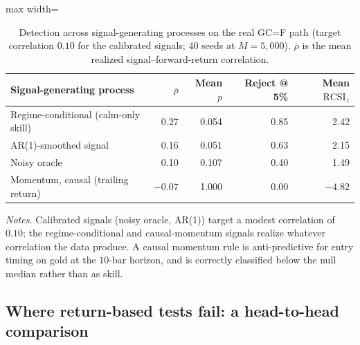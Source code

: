 \documentclass[preprint,12pt]{elsarticle}
\theoremstyle{definition}
\begin{document}
\begin{table}[H]
\centering
\caption{Detection across signal-generating processes on the real GC=F path (target correlation $0.10$ for the calibrated signals; $40$ seeds at $M=5{,}000$). $\bar\rho$ is the mean realized signal--forward-return correlation.}
\label{tab:signal_mechanisms}
{\small
\renewcommand{\arraystretch}{1.12}
\begin{adjustbox}{max width=\textwidth}
\begin{tabular}{@{}lrrrr@{}}
\toprule
Signal-generating process & $\bar\rho$ & Mean $p$ & Reject @ 5\% & Mean $\mathrm{RCSI}_z$ \\
\midrule
Regime-conditional (calm-only skill) & \phantom{-}0.27 & 0.054 & 0.85 & \phantom{-}2.42 \\
AR(1)-smoothed signal & \phantom{-}0.16 & 0.051 & 0.63 & \phantom{-}2.15 \\
Noisy oracle & \phantom{-}0.10 & 0.107 & 0.40 & \phantom{-}1.49 \\
Momentum, causal (trailing return) & $-0.07$ & 1.000 & 0.00 & $-4.82$ \\
\bottomrule
\end{tabular}
\end{adjustbox}
}
\par\vspace{0.5em}
\begin{minipage}{0.95\textwidth}
\centering
\footnotesize\emph{Notes.} Calibrated signals (noisy oracle, AR(1)) target a modest correlation of $0.10$; the regime-conditional and causal-momentum signals realize whatever correlation the data produce. A causal momentum rule is anti-predictive for entry timing on gold at the $10$-bar horizon, and is correctly classified below the null median rather than as skill.
\end{minipage}
\end{table}

\subsection{Where return-based tests fail: a head-to-head comparison}
\label{sec:competitor}
\end{document}
